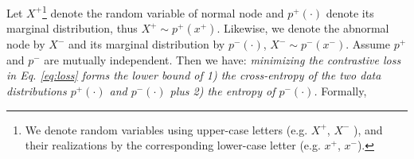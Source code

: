 		


\begin{theorem} 
	Let $X^+$\footnote{We denote random variables using upper-case letters (e.g. $X^+$, $X^-$ ), and their realizations by the corresponding lower-case letter (e.g. $x^+$, $x^-$).} denote the random variable of normal node and $p^+(\cdot)$ denote its marginal distribution, thus $X^+\!\sim \!p^+(x^+)$. Likewise, we denote the abnormal node by $X^-$ and its marginal distribution by $p^-(\cdot)$, $X^-\!\sim \!p^-(x^-)$. Assume $p^+$ and $p^-$ are mutually independent.
	Then we have: \textit{minimizing the contrastive loss in Eq. \eqref{eq:loss} forms the lower bound of 
		1) the cross-entropy of the two data distributions $p^+(\cdot)$ and $p^-(\cdot)$ plus 
		2) the entropy of $p^-(\cdot)$.} Formally,  

\end{theorem}



